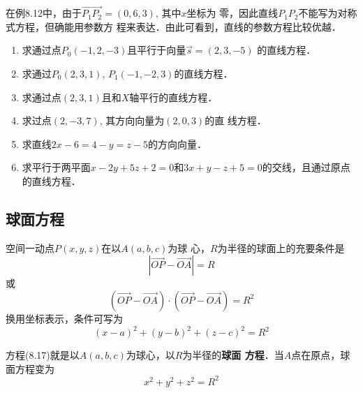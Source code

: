 在例8.12中，由于$\Vec{P_1P_2}=(0,6,3)$, 其中$x$坐标为
零，因此直线$P_1P_2$不能写为对称式方程，但确能用参数方
程来表达．由此可看到，直线的参数方程比较优越．


\begin{ex}
\begin{enumerate}
    \item 求通过点$P_0(-1,2,-3)$且平行于向量$\vec{s}=(2,3,-5)$
    的直线方程．
    \item 求通过$P_0(2,3,1)$, $P_1(-1,-2,3)$的直线方程．
    \item 求通过点$(2,3,1)$且和$X$轴平行的直线方程．
    \item 求过点$(2,-3,7)$, 其方向向量为$(2,0,3)$的直
    线方程．
    \item 求直线$2x-6=4-y=z-5$的方向向量．
    \item 求平行于两平面$x-2y+5z+2=0$和$3x+y-z
    +5=0$的交线，且通过原点的直线方程．
\end{enumerate}
\end{ex}


\subsection{球面方程}
空间一动点$P(x,y,z)$在以$A(a,b,c)$为球
心，$R$为半径的球面上的充要条件是
\[|\Vec{OP}-\Vec{OA}|=R\]
或
\[(\Vec{OP}-\Vec{OA})\cdot (\Vec{OP}-\Vec{OA})=R^2\]
换用坐标表示，条件可写为
\begin{equation}
    (x-a)^2+(y-b)^2+(z-c)^2=R^2
\end{equation}

\begin{figure}[htp]
    \centering
{}
    \caption{}
\end{figure}


方程(8.17)就是以$A(a,b,c)$为球心，以$R$为半径的\textbf{球面
方程}．当$A$点在原点，球面方程变为
\[    x^2+y^2+z^2=R^2\]




